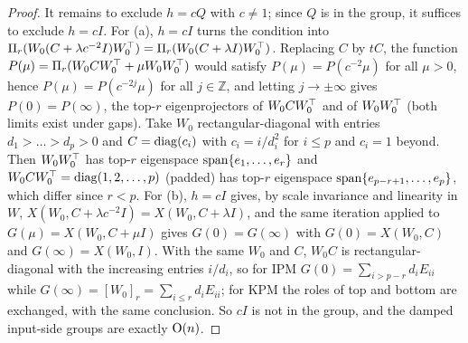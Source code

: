 \begin{proof}
It remains to exclude $h=cQ$ with $c\ne1$; since $Q$ is in the group, it suffices to exclude $h=cI$. For (a), $h=cI$ turns the
condition into $\Pi_r(W_0(C+\lambda c^{-2}I)W_0^{\top})=\Pi_r(W_0(C+\lambda I)W_0^{\top})$. Replacing $C$ by $tC$, the function
$P(\mu)=\Pi_r(W_0CW_0^{\top}+\mu W_0W_0^{\top})$ would satisfy $P(\mu)=P(c^{-2}\mu)$ for all $\mu>0$, hence $P(\mu)=P(c^{-2j}\mu)$ for all
$j\in\mathbb Z$, and letting $j\to\pm\infty$ gives $P(0)=P(\infty)$, the top-$r$ eigenprojectors of $W_0CW_0^{\top}$ and of $W_0W_0^{\top}$
(both limits exist under gaps). Take $W_0$ rectangular-diagonal with entries $d_1>\dots>d_p>0$ and $C=\operatorname{diag}(c_i)$ with
$c_i=i/d_i^2$ for $i\le p$ and $c_i=1$ beyond. Then $W_0W_0^{\top}$ has top-$r$ eigenspace $\operatorname{span}\{e_1,\dots,e_r\}$ and
$W_0CW_0^{\top}=\operatorname{diag}(1,2,\dots,p)$ (padded) has top-$r$ eigenspace $\operatorname{span}\{e_{p-r+1},\dots,e_p\}$, which differ since $r<p$. For (b),
$h=cI$ gives, by scale invariance and linearity in $W$, $X(W_0,C+\lambda c^{-2}I)=X(W_0,C+\lambda I)$, and the same iteration
applied to $G(\mu)=X(W_0,C+\mu I)$ gives $G(0)=G(\infty)$ with $G(0)=X(W_0,C)$ and $G(\infty)=X(W_0,I)$. With the same $W_0$ and
$C$, $W_0C$ is rectangular-diagonal with the increasing entries $i/d_i$, so for IPM $G(0)=\sum_{i>p-r}d_iE_{ii}$ while
$G(\infty)=[W_0]_r=\sum_{i\le r}d_iE_{ii}$; for KPM the roles of top and bottom are exchanged, with the same conclusion. So
$cI$ is not in the group, and the damped input-side groups are exactly $\mathrm{O}(n)$.


\end{proof}
